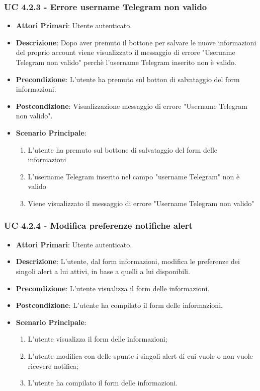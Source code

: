 			\subsubsection{UC 4.2.3 - Errore username Telegram non valido}
			\begin{itemize}
				\item \textbf{Attori Primari}: Utente autenticato.
				\item \textbf{Descrizione}: Dopo aver premuto il bottone per salvare le nuove informazioni del proprio account viene visualizzato il messaggio di errore "Username Telegram non valido" perchè l'username Telegram inserito non è valido. 
				\item \textbf{Precondizione}: L'utente ha premuto sul botton di salvataggio del form informazioni.
				\item \textbf{Postcondizione}: Visualizzazione messaggio di errore "Username Telegram non valido".
				\item \textbf{Scenario Principale}:
				\begin{enumerate}
					\item{L'utente ha premuto sul bottone di salvataggio del form delle informazioni}
					\item{L'username Telegram inserito nel campo "username Telegram" non è valido}
					\item{Viene visualizzato il messaggio di errore "Username Telegram non valido"}
				\end{enumerate}	
			\end{itemize}

			\subsubsection{UC 4.2.4 - Modifica preferenze notifiche alert}
			\begin{itemize}
				\item \textbf{Attori Primari}: Utente autenticato.
				\item \textbf{Descrizione}: L'utente, dal form informazioni, modifica le preferenze dei singoli alert a lui attivi, in base a quelli a lui disponibili.
				\item \textbf{Precondizione}: L'utente visualizza il form delle informazioni.
				\item \textbf{Postcondizione}: L'utente ha compilato il form delle informazioni.
				\item \textbf{Scenario Principale}:
				\begin{enumerate}
					\item{L'utente visualizza il form delle informazioni;}
					\item{L'utente modifica con delle spunte i singoli alert di cui vuole o non vuole ricevere notifica; }
					\item{L'utente ha compilato il form delle informazioni.}
				\end{enumerate}
			\end{itemize}